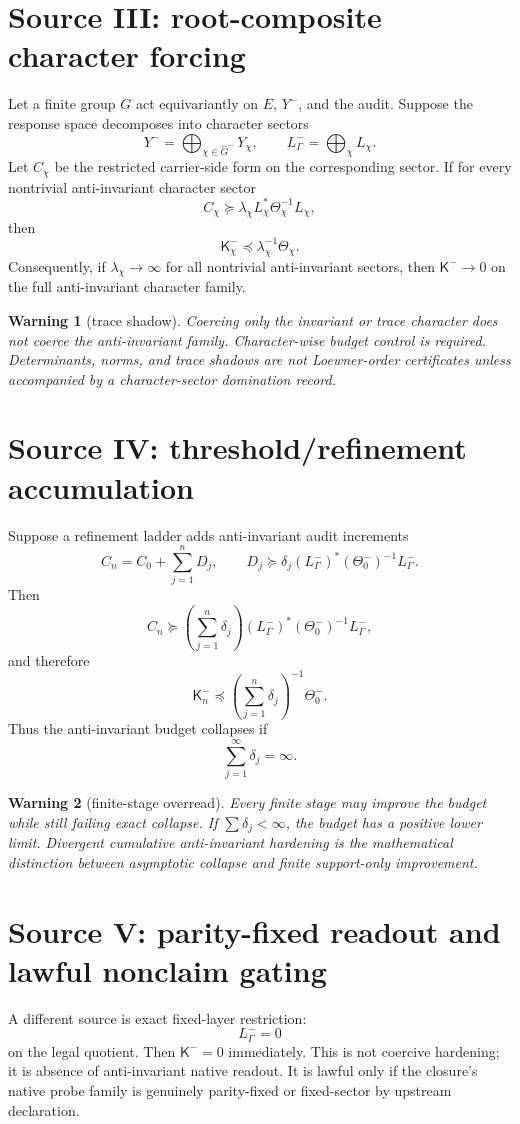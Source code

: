 \documentclass[11pt]{article}
\newtheorem{warning}{Warning}
\newcommand{\K}{\mathsf K}
\newcommand{\T}{\Theta}
\begin{document}
\section{Source III: root-composite character forcing}
Let a finite group \(G\) act equivariantly on \(E\), \(Y^-\), and the audit.  Suppose the response space decomposes into character sectors
\[
Y^- = \bigoplus_{\chi\in \widehat G^-}Y_\chi,
\qquad L^-_\Gamma=\bigoplus_\chi L_\chi.
\]
Let \(C_\chi\) be the restricted carrier-side form on the corresponding sector.  If for every nontrivial anti-invariant character sector
\[
C_\chi\succeq \lambda_\chi L_\chi^*\Theta_\chi^{-1}L_\chi,
\]
then
\[
\K^-_\chi\preceq \lambda_\chi^{-1}\Theta_\chi.
\]
Consequently, if \(\lambda_\chi\to\infty\) for all nontrivial anti-invariant sectors, then \(\K^-\to0\) on the full anti-invariant character family.

\begin{warning}[trace shadow]
Coercing only the invariant or trace character does not coerce the anti-invariant family.  Character-wise budget control is required.  Determinants, norms, and trace shadows are not Loewner-order certificates unless accompanied by a character-sector domination record.
\end{warning}

\section{Source IV: threshold/refinement accumulation}
Suppose a refinement ladder adds anti-invariant audit increments
\[
C_n=C_0+\sum_{j=1}^n D_j,
\qquad D_j\succeq \delta_j (L^-_\Gamma)^*(\T^-_0)^{-1}L^-_\Gamma.
\]
Then
\[
C_n\succeq \left(\sum_{j=1}^n\delta_j\right)(L^-_\Gamma)^*(\T^-_0)^{-1}L^-_\Gamma,
\]
and therefore
\[
\K^-_n\preceq \left(\sum_{j=1}^n\delta_j\right)^{-1}\T^-_0.
\]
Thus the anti-invariant budget collapses if
\[
\sum_{j=1}^{\infty}\delta_j=\infty.
\]

\begin{warning}[finite-stage overread]
Every finite stage may improve the budget while still failing exact collapse.  If \(\sum\delta_j<\infty\), the budget has a positive lower limit.  Divergent cumulative anti-invariant hardening is the mathematical distinction between asymptotic collapse and finite support-only improvement.
\end{warning}

\section{Source V: parity-fixed readout and lawful nonclaim gating}
A different source is exact fixed-layer restriction:
\[
L^-_\Gamma=0
\]
on the legal quotient.  Then \(\K^-=0\) immediately.  This is not coercive hardening; it is absence of anti-invariant native readout.  It is lawful only if the closure's native probe family is genuinely parity-fixed or fixed-sector by upstream declaration.
\end{document}
